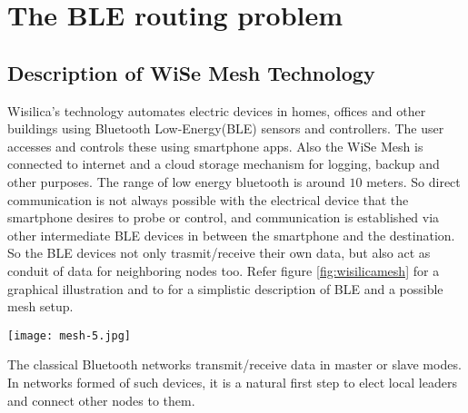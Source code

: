\documentclass[fleqn,a4paper]{SelfArx}
\affiliation{*\textbf{e-mail}: george.scaria@gmail.com}
\begin{document}
\flushbottom 

\maketitle 

\tableofcontents 

\thispagestyle{empty} 

\section{The BLE routing problem} %

\subsection{Description of WiSe Mesh Technology}

\par Wisilica's technology automates electric devices in homes, offices and other buildings using Bluetooth Low-Energy(BLE)
sensors and controllers. The user accesses and controls these using smartphone apps. Also the WiSe Mesh is connected
to internet and a cloud storage mechanism for logging, backup and other purposes. The range of 
low energy bluetooth is around $10$ meters. So direct communication is not always possible with the electrical 
device that the smartphone desires to probe or control, and communication is established via other intermediate BLE
devices in between the smartphone and the destination. So the BLE devices not only trasmit/receive their own data, 
but also act as conduit of data for neighboring nodes too. Refer figure \ref{fig:wisilicamesh} for a graphical illustration
and to \cite{Haatanen:2012thesis} for a simplistic description of BLE and a possible mesh setup.

\begin{figure*}[ht]\centering %
\texttt{[image: mesh-5.jpg]}\caption{Smartphone operating a device(Source: \href{http://wisilica.com/wise-mesh.html}{Wisilica website})}
\label{fig:wisilicamesh}
\end{figure*}

\par The classical Bluetooth networks transmit/receive data in master or slave modes. In networks formed of such devices,
it is a natural first step to elect local leaders and connect other nodes to them. 
\end{document}
